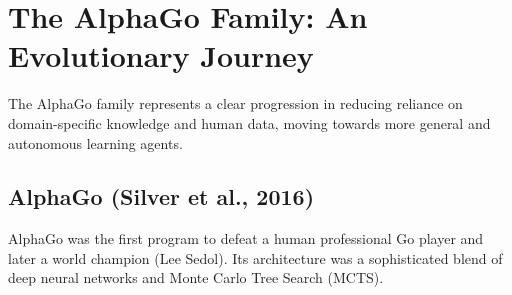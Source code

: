 \documentclass[11pt,a4paper]{article}
\begin{document}
\section{The AlphaGo Family: An Evolutionary Journey}

The AlphaGo family represents a clear progression in reducing reliance on domain-specific knowledge and human data, moving towards more general and autonomous learning agents.

\subsection{AlphaGo (Silver et al., 2016)~\cite{alphago}}
AlphaGo was the first program to defeat a human professional Go player and later a world champion (Lee Sedol). Its architecture was a sophisticated blend of deep neural networks and Monte Carlo Tree Search (MCTS).
\end{document}
